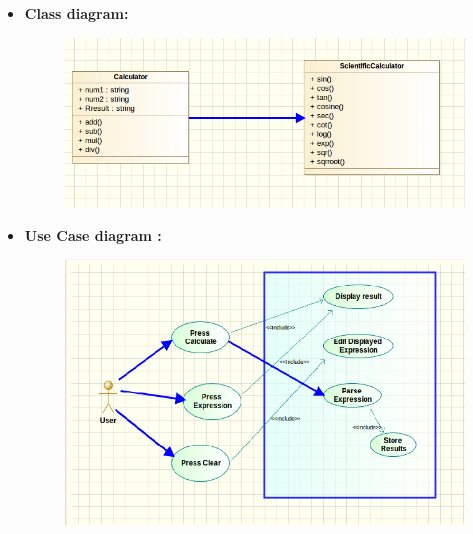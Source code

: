 \documentclass[a4paper,12pt]{article}
\begin{document}
\begin{itemize}
\item \textbf{Class diagram:}
\begin{figure}[h!]
		\centering
		\includegraphics[scale=0.5]{calculator.png}
	\end{figure}



\newpage
\item \textbf{Use Case diagram :}
\begin{figure}[h!]
		\centering
		\includegraphics[scale=0.5]{usecase.png}
	\end{figure}


\end{itemize}
\end{document}
